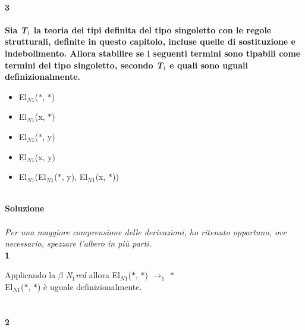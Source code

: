 \paragraph{3} \textbf{Sia \textit{T$_1$} la teoria dei tipi definita del tipo singoletto con le regole strutturali, definite in questo capitolo, incluse quelle di sostituzione e indebolimento. Allora stabilire se i seguenti termini sono tipabili come termini del tipo singoletto, secondo \textit{T$_1$} e quali sono uguali definizionalmente.}
\begin{itemize}
\item El$_{N1}$($\ast$, $\ast$)
\item El$_{N1}$(x, $\ast$)
\item El$_{N1}$($\ast$, y)
\item El$_{N1}$(x, y)
\item El$_{N1}$(El$_{N1}$($\ast$, y), El$_{N1}$(x, $\ast$))
\end{itemize}
\noindent
\\
\textbf{Soluzione}\\\\
\textit{Per una maggiore comprensione delle derivazioni, ho ritenuto opportuno, ove necessario, spezzare l'albero in pi\`u parti.}\\
\noindent
\textbf{1}\\
\small
\begin{prooftree}
\end{prooftree}
\normalsize
Applicando la \textit{$\beta$ N$_1$red} allora El$_{N1}$($\ast$, $\ast$) $\rightarrow_1$ $\ast$ \\
El$_{N1}$($\ast$, $\ast$) \`e uguale definizionalmente.
\\\\\\
\noindent
\textbf{2}\\
\scriptsize
\begin{prooftree}
\end{prooftree}

